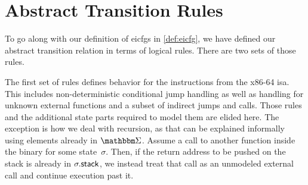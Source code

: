 \section{Abstract Transition Rules}\label{sec:step-function}
To go along with our definition of \acp{eicfg} in \cref{def:eicfg},
we have defined our abstract transition relation in terms of logical rules.
There are two sets of those rules.

The first set of rules defines behavior for the instructions from the x86-64 \ac{isa}.
This includes non-deterministic conditional jump handling as well as handling for unknown external functions and a subset of indirect jumps and calls.
Those rules and the additional state parts required to model them are elided here.
The exception is how we deal with recursion, as that can be explained informally using elements already in $\absState$.
Assume a call to another function inside the binary for some state~$\sigma$. Then, if the return address to be pushed on the stack is already in $\sigma.\mathsf{stack}$, we instead treat that call as an unmodeled external call and continue execution past it.

